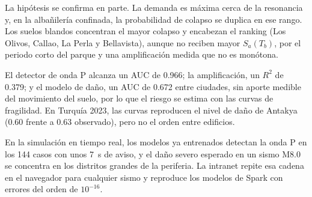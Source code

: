 \documentclass[conference]{IEEEtran}%
\begin{document}
La hipótesis se confirma en parte. La demanda es máxima cerca de la resonancia y, en la albañilería confinada, la probabilidad de colapso se duplica en ese rango. Los suelos blandos concentran el mayor colapso y encabezan el ranking (Los Olivos, Callao, La Perla y Bellavista), aunque no reciben mayor $S_a(T_b)$, por el periodo corto del parque y una amplificación medida que no es monótona.

El detector de onda P alcanza un AUC de 0.966; la amplificación, un $R^{2}$ de 0.379; y el modelo de daño, un AUC de 0.672 entre ciudades, sin aporte medible del movimiento del suelo, por lo que el riesgo se estima con las curvas de fragilidad. En Turquía 2023, las curvas reproducen el nivel de daño de Antakya (0.60 frente a 0.63 observado), pero no el orden entre edificios.

En la simulación en tiempo real, los modelos ya entrenados detectan la onda P en los 144 casos con unos 7~s de aviso, y el daño severo esperado en un sismo M8.0 se concentra en los distritos grandes de la periferia. La intranet repite esa cadena en el navegador para cualquier sismo y reproduce los modelos de Spark con errores del orden de $10^{-16}$.
\end{document}
